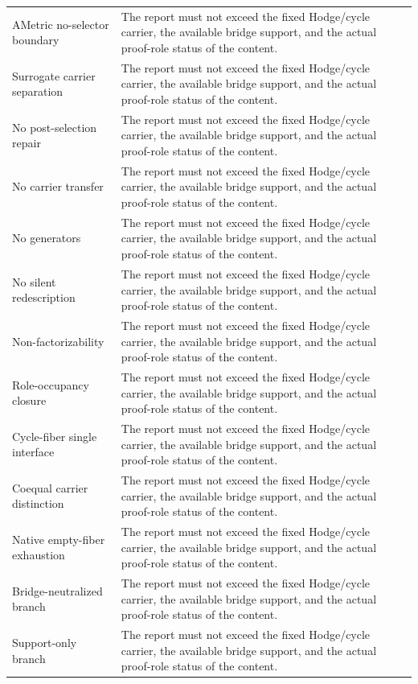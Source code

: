 \documentclass[11pt]{article}
\begin{document}
{\begin{longtable}{p{}p{}}
AMetric no-selector boundary & The report must not exceed the fixed Hodge/cycle carrier, the available bridge support, and the actual proof-role status of the content.\\
Surrogate carrier separation & The report must not exceed the fixed Hodge/cycle carrier, the available bridge support, and the actual proof-role status of the content.\\
No post-selection repair & The report must not exceed the fixed Hodge/cycle carrier, the available bridge support, and the actual proof-role status of the content.\\
No carrier transfer & The report must not exceed the fixed Hodge/cycle carrier, the available bridge support, and the actual proof-role status of the content.\\
No generators & The report must not exceed the fixed Hodge/cycle carrier, the available bridge support, and the actual proof-role status of the content.\\
No silent redescription & The report must not exceed the fixed Hodge/cycle carrier, the available bridge support, and the actual proof-role status of the content.\\
Non-factorizability & The report must not exceed the fixed Hodge/cycle carrier, the available bridge support, and the actual proof-role status of the content.\\
Role-occupancy closure & The report must not exceed the fixed Hodge/cycle carrier, the available bridge support, and the actual proof-role status of the content.\\
Cycle-fiber single interface & The report must not exceed the fixed Hodge/cycle carrier, the available bridge support, and the actual proof-role status of the content.\\
Coequal carrier distinction & The report must not exceed the fixed Hodge/cycle carrier, the available bridge support, and the actual proof-role status of the content.\\
Native empty-fiber exhaustion & The report must not exceed the fixed Hodge/cycle carrier, the available bridge support, and the actual proof-role status of the content.\\
Bridge-neutralized branch & The report must not exceed the fixed Hodge/cycle carrier, the available bridge support, and the actual proof-role status of the content.\\
Support-only branch & The report must not exceed the fixed Hodge/cycle carrier, the available bridge support, and the actual proof-role status of the content.\\

\end{longtable}}
\end{document}
